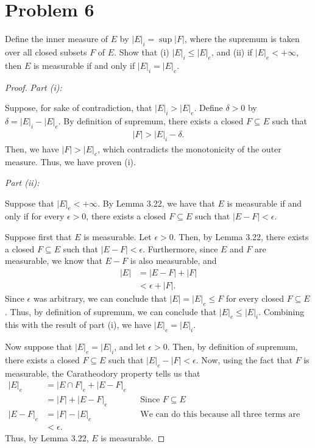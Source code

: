 \documentclass[10pt,a4paper]{article}
\makeatletter
\theoremstyle{theorem}
\newcommand{\proofpart}[2]{%
  \par
  \addvspace{\medskipamount}%
  \noindent\emph{Part #1: #2}\par\nobreak
  \addvspace{\smallskipamount}%
  \@afterheading
}
\theoremstyle{definition}
\makeatother
\begin{document}
\section*{Problem 6}
Define the inner measure of $E$ by $|E|_i = \sup|F|$, where the supremum is taken over all closed subsets $F$ of $E$. Show that (i) $|E|_i \leq |E|_e$,  and (ii) if $|E|_e < + \infty$, then $E$ is measurable if and only if $|E|_i = |E|_e$.
\begin{proof}
\proofpart{(i)}{} Suppose, for sake of contradiction, that $|E|_i > |E|_e$. Define $\delta > 0$ by $\delta = |E|_i - |E|_e$. By definition of supremum, there exists a closed $F \subseteq E$ such that 
\begin{align*}
|F| > |E|_i - \delta.
\end{align*}
Then, we have $|F| > |E|_e$, which contradicts the monotonicity of the outer measure. Thus, we have proven (i).

\proofpart{(ii)}{} Suppose that $|E|_e < +\infty$. By Lemma 3.22, we have that $E$ is measurable if and only if for every $\epsilon > 0$, there exists a closed $F \subseteq E$ such that $|E - F| < \epsilon$. 

Suppose first that $E$ is measurable. Let $\epsilon > 0$. Then, by Lemma 3.22, there exists a closed $F \subseteq E$ such that $|E - F| < \epsilon$. Furthermore, since $E$ and $F$ are measurable, we know that $E - F$ is also measurable,  and
\begin{align*}
|E| &= |E - F| + |F|\\
&< \epsilon + |F|.
\end{align*}
Since $\epsilon$ was arbitrary, we can conclude that $|E| = |E|_e \leq F$ for every closed $F \subseteq E$. Thus, by definition of supremum, we can conclude that $|E|_e \leq |E|_i$. Combining this with the result of part (i), we have $|E|_e = |E|_i$.

Now suppose that $|E|_e = |E|_i$, and let $\epsilon >0$. Then, by definition of supremum, there exists a closed $F \subseteq E$ such that $|E|_e - |F| < \epsilon$.  Now, using the fact that $F$ is measurable, the Caratheodory property tells us that
\begin{align*}
|E|_e &= |E \cap F|_e + |E - F|_e\\
&= |F| + |E - F|_e &&\text{Since } F \subseteq E\\
|E - F|_e &= |F| - |E|_e&&\text{We can do this because all three terms are finite.}\\
&< \epsilon.
\end{align*}
Thus, by Lemma 3.22, $E$ is measurable.
\end{proof}
\end{document}
